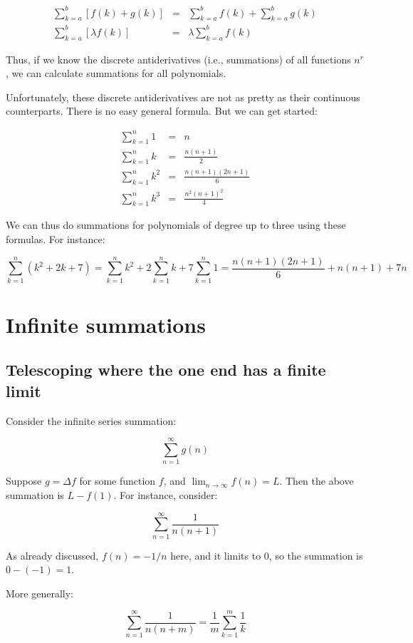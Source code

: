 \documentclass{amsart}
\begin{document}
\begin{eqnarray*}
  \sum_{k=a}^b [f(k) + g(k)] & = & \sum_{k=a}^b f(k) + \sum_{k=a}^b g(k)\\
  \sum_{k=a}^b [\lambda f(k)] & = & \lambda \sum_{k=a}^b f(k)
\end{eqnarray*}

Thus, if we know the discrete antiderivatives (i.e., summations) of
all functions $n^r$, we can calculate summations for all polynomials.

Unfortunately, these discrete antiderivatives are not as pretty as
their continuous counterparts. There is no easy general formula. But
we can get started:

\begin{eqnarray*}
  \sum_{k=1}^n 1 & = & n\\
  \sum_{k=1}^n k & = & \frac{n(n + 1)}{2}\\
  \sum_{k=1}^n k^2 & = & \frac{n(n+1)(2n+1)}{6}\\
  \sum_{k=1}^n k^3 & = & \frac{n^2(n+1)^2}{4}
\end{eqnarray*}

We can thus do summations for polynomials of degree up to three using
these formulas. For instance:

$$\sum_{k=1}^n (k^2 + 2k + 7) = \sum_{k=1}^n k^2 + 2 \sum_{k=1}^n k + 7 \sum_{k=1}^n 1 = \frac{n(n + 1)(2n + 1)}{6} + n(n+1) + 7n$$

\section{Infinite summations}

\subsection{Telescoping where the one end has a finite limit}

Consider the infinite series summation:

$$\sum_{n=1}^\infty g(n)$$

Suppose $g = \Delta f$ for some function $f$, and $\lim_{n \to \infty}
f(n) = L$. Then the above summation is $L - f(1)$. For instance, consider:

$$\sum_{n=1}^\infty \frac{1}{n(n+1)}$$

As already discussed, $f(n) = -1/n$ here, and it limits to $0$, so the
summation is $0 - (-1) = 1$.

More generally:

$$\sum_{n=1}^\infty \frac{1}{n(n+m)} = \frac{1}{m}\sum_{k=1}^m \frac{1}{k}$$
\end{document}
